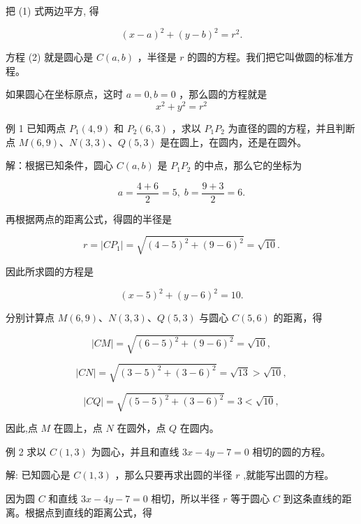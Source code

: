 \documentclass[lang=cn,newtx,12pt,scheme=chinese]{elegantbook}
\begin{document}
把 (1) 式两边平方, 得

\[
    {\left( x - a\right) }^{2} + {\left( y - b\right) }^{2} = {r}^{2}. \tag{2}
\]

方程 (2) 就是圆心是 \(C\left( {a,b}\right)\) ，半径是 \(r\) 的圆的方程。我们把它叫做圆的标准方程。

\begin{definition}[圆的标准方程]
	如果圆心在坐标原点，这时 \(a = 0,b = 0\) ，那么圆的方程就是
	\[
	{x}^{2} + {y}^{2} = {r}^{2}
	\]
\end{definition}

例 1  已知两点 \({P}_{1}\left( {4,9}\right)\) 和 \({P}_{2}\left( {6,3}\right)\) ，求以 \({P}_{1}{P}_{2}\) 为直径的圆的方程，并且判断点 \(M\left( {6,9}\right) \text{、}N\left( {3,3}\right) \text{、}Q\left( {5,3}\right)\) 是在圆上，在圆内，还是在圆外。

解：根据已知条件，圆心 \(C\left( {a,b}\right)\) 是 \({P}_{1}{P}_{2}\) 的中点，那么它的坐标为

\[
  a = \frac{4 + 6}{2} = 5,\;b = \frac{9 + 3}{2} = 6.
\]

再根据两点的距离公式，得圆的半径是

\[
  r = \left| {C{P}_{1}}\right| = \sqrt{{\left( 4 - 5\right) }^{2} + {\left( 9 - 6\right) }^{2}} = \sqrt{10}.
\]

因此所求圆的方程是

\[
    {\left( x - 5\right) }^{2} + {\left( y - 6\right) }^{2} = {10}.
\]

分别计算点 \(M\left( {6,9}\right) \text{、}N\left( {3,3}\right) \text{、}Q\left( {5,3}\right)\) 与圆心 \(C\left( {5,6}\right)\) 的距离，得

\[
  \left| {CM}\right| = \sqrt{{\left( 6 - 5\right) }^{2} + {\left( 9 - 6\right) }^{2}} = \sqrt{10},
\]

\[
  \left| {CN}\right| = \sqrt{{\left( 3 - 5\right) }^{2} + {\left( 3 - 6\right) }^{2}} = \sqrt{13} > \sqrt{10},
\]

\[
  \left| {CQ}\right| = \sqrt{{\left( 5 - 5\right) }^{2} + {\left( 3 - 6\right) }^{2}} = 3 < \sqrt{10},
\]

因此,点 \(M\) 在圆上，点 \(N\) 在圆外，点 \(Q\) 在圆内。

例 2 求以 \(C\left( {1,3}\right)\) 为圆心，并且和直线 \({3x} - {4y} - 7 = 0\) 相切的圆的方程。

解: 已知圆心是 \(C\left( {1,3}\right)\) ，那么只要再求出圆的半径 \(r\) ,就能写出圆的方程。

因为圆 \(C\) 和直线 \({3x} - {4y} - 7 = 0\) 相切，所以半径 \(r\) 等于圆心 \(C\) 到这条直线的距离。根据点到直线的距离公式，得
\end{document}
